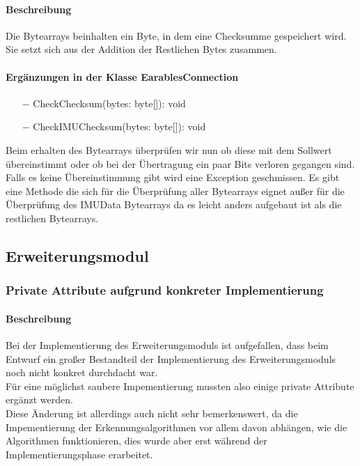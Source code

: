 \documentclass[a4paper,12pt]{article}
\begin{document}
\paragraph{Beschreibung}
Die Bytearrays beinhalten ein Byte, in dem eine Checksumme gespeichert wird. Sie setzt sich aus der Addition der Restlichen Bytes zusammen. 

\paragraph{Ergänzungen in der Klasse EarablesConnection}
\begin{itemize}
	\item[$-$] CheckChecksum(bytes: byte[]): void
	\item[$-$] CheckIMUChecksum(bytes: byte[]): void
\end{itemize}
Beim erhalten des Bytearrays überprüfen wir nun ob diese mit dem Sollwert übereinstimmt oder ob bei der Übertragung ein paar Bits verloren gegangen sind. Falls es keine Übereinstimmung gibt wird eine Exception geschmissen. Es gibt eine Methode die sich für die Überprüfung aller Bytearrays eignet außer für die Überprüfung des IMUData Bytearrays da es leicht anders aufgebaut ist als die restlichen Bytearrays.

\subsection{Erweiterungsmodul}


\subsubsection{Private Attribute aufgrund konkreter Implementierung}
\paragraph{Beschreibung}
Bei der Implementierung des Erweiterungsmoduls ist aufgefallen, dass beim Entwurf ein großer Bestandteil der Implementierung des Erweiterungsmoduls noch nicht konkret durchdacht war.\\
Für eine möglichst saubere Impementierung mussten also einige private Attribute ergänzt werden.\\ 
Diese Änderung ist allerdings auch nicht sehr bemerkenswert, da die Impementierung der Erkennungsalgorithmen vor allem davon abhängen, wie die Algorithmen funktionieren, dies wurde aber erst während der Implementierungsphase erarbeitet. \\
\end{document}
